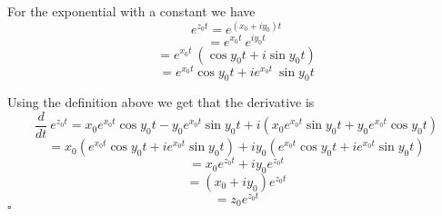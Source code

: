\documentclass[11pt, oneside]{article}
\begin{document}
For the exponential with a constant we have
\[ e^{z_0 t} = e^{(x_0 + iy_0) t} \]
\[ = e^{x_0t} \ e^{i y_0 t} \]
\[ = e^{x_0t} \ (\cos y_0 t + i \sin y_0 t) \]
\[ = e^{x_0t} \cos y_0 t + i e^{x_0t} \ \sin y_0 t \]

Using the definition above we get that the derivative is
\[ \frac{d}{dt} \ e^{z_0 t} = x_0 e^{x_0t} \cos y_0 t  - y_0 e^{x_0t} \sin y_0 t + i(x_0 e^{x_0t} \sin y_0 t + y_0 e^{x_0t} \cos y_0 t) \]
\[ = x_0(e^{x_0t} \cos y_0 t + i e^{x_0 t} \sin y_0 t) + i y_0(e^{x_0t} \cos y_0 t + i e^{x_0 t} \sin y_0 t) \]
\[ = x_0 e^{z_0 t} + i y_0 e^{z_0 t} \]
\[ = (x_0 + iy_0) e^{z_0 t} \]
\[ = z_0 e^{z_0 t} \]
$\square$
\end{document}
